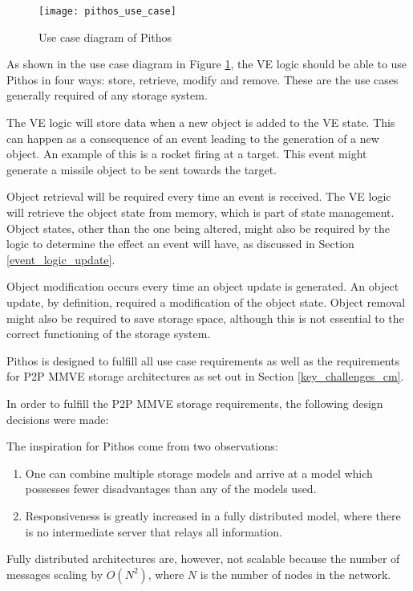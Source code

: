 \begin{figure}[htbp]
 \centering
 \texttt{[image: pithos\_use\_case]}
 \caption{Use case diagram of Pithos}
 \label{fig_pithos_use_case}
\end{figure}

As shown in the use case diagram in Figure \ref{fig_pithos_use_case}, the VE logic should be able to use Pithos in four ways: store, retrieve, modify and remove. These are the use cases generally required of any storage system.

The VE logic will store data when a new object is added to the VE state. This can happen as a consequence of an event leading to the generation of a new object. An example of this is a rocket firing at a target. This event might generate a missile object to be sent towards the target.

Object retrieval will be required every time an event is received. The VE logic will retrieve the object state from memory, which is part of state management. Object states, other than the one being altered, might also be required by the logic to determine the effect an event will have, as discussed in Section \ref{event_logic_update}.

Object modification occurs every time an object update is generated. An object update, by definition, required a modification of the object state. Object removal might also be required to save storage space, although this is not essential to the correct functioning of the storage system.

Pithos is designed to fulfill all use case requirements as well as the requirements for P2P MMVE storage architectures as set out in Section \ref{key_challenges_cm}.

In order to fulfill the P2P MMVE storage requirements, the following design decisions were made:

The inspiration for Pithos come from two observations:
%
\begin{enumerate}
  \item One can combine multiple storage models and arrive at a model which possesses fewer disadvantages than any of the models used.
  \item Responsiveness is greatly increased in a fully distributed model, where there is no intermediate server that relays all information.
\end{enumerate}

Fully distributed architectures are, however, not scalable because the number of messages scaling by $O(N^2)$, where $N$ is the number of nodes in the network.

